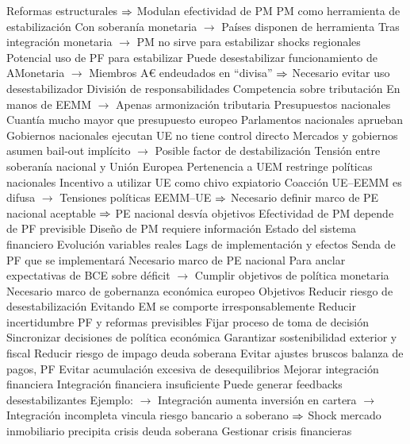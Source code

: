 \documentclass{nuevotema}
\begin{document}
\begin{esquemal}
				\4[] Reformas estructurales
				\4[] $\then$ Modulan efectividad de PM
				\4 PM como herramienta de estabilización
				\4[] Con soberanía monetaria
				\4[] $\to$ Países disponen de herramienta
				\4[] Tras integración monetaria
				\4[] $\to$ PM no sirve para estabilizar shocks regionales
				\4 Potencial uso de PF para estabilizar
				\4[] Puede desestabilizar funcionamiento de AMonetaria
				\4[] $\to$ Miembros A€ endeudados en ``divisa''
				\4[] $\then$ Necesario evitar uso  desestabilizador
			\3 División de responsabilidades
				\4 Competencia sobre tributación
				\4[] En manos de EEMM
				\4[] $\to$ Apenas armonización tributaria
				\4 Presupuestos nacionales
				\4[] Cuantía mucho mayor que presupuesto europeo
				\4[] Parlamentos nacionales aprueban
				\4[] Gobiernos nacionales ejecutan
				\4[] UE no tiene control directo
				\4[] Mercados y gobiernos asumen bail-out implícito
				\4[] $\to$ Posible factor de destabilización
			\3 Tensión entre soberanía nacional y Unión Europea
				\4 Pertenencia a UEM restringe políticas nacionales
				\4[] Incentivo a utilizar UE como chivo expiatorio
				\4[] Coacción UE--EEMM es difusa
				\4[] $\to$ Tensiones políticas EEMM--UE
				\4[] $\then$ Necesario definir marco de PE nacional aceptable
				\4[] $\then$ PE nacional desvía objetivos
			\3 Efectividad de PM depende de PF previsible
				\4 Diseño de PM requiere información
				\4[] Estado del sistema financiero
				\4[] Evolución variables reales
				\4[] Lags de implementación y efectos
				\4[] Senda de PF que se implementará
				\4 Necesario marco de PE nacional
				\4[] Para anclar expectativas de BCE sobre déficit
				\4[] $\to$ Cumplir objetivos de política monetaria
			\3[$\then$] Necesario marco de gobernanza económica europeo
		\2 Objetivos
			\3 Reducir riesgo de desestabilización
				\4 Evitando EM se comporte irresponsablemente
			\3 Reducir incertidumbre
				\4 PF y reformas previsibles
				\4 Fijar proceso de toma de decisión
				\4 Sincronizar decisiones de política económica
			\3 Garantizar sostenibilidad exterior y fiscal
				\4 Reducir riesgo de impago deuda soberana
				\4 Evitar ajustes bruscos balanza de pagos, PF
				\4 Evitar acumulación excesiva de desequilibrios
			\3 Mejorar integración financiera
				\4 Integración financiera insuficiente
				\4[] Puede generar feedbacks desestabilizantes
				\4[] Ejemplo:
				\4[] $\to$ Integración aumenta inversión en cartera
				\4[] $\to$ Integración incompleta vincula riesgo bancario a soberano
				\4[] $\then$ Shock mercado inmobiliario precipita crisis deuda soberana
			\3 Gestionar crisis financieras

\end{esquemal}
\end{document}
